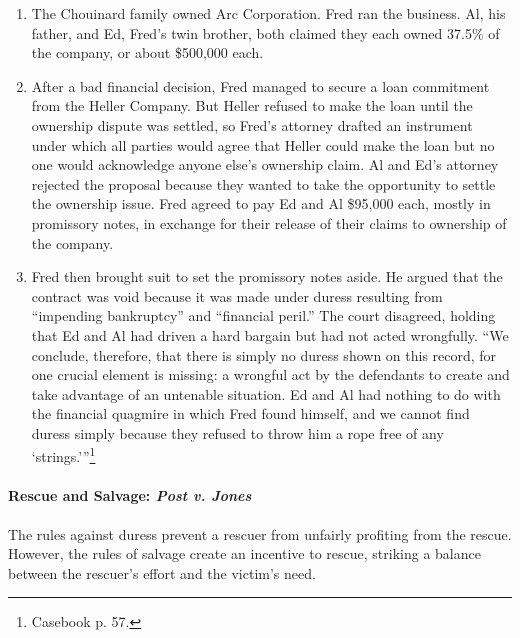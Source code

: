 \begin{enumerate}
    \item The Chouinard family owned Arc Corporation. Fred ran the business. 
    Al, his father, and Ed, Fred's twin brother, both claimed they each owned 
    37.5\% of the company, or about \$500,000 each.
    \item After a bad financial decision, Fred managed to secure a loan 
    commitment from the Heller Company. But Heller refused to make the loan 
    until the ownership dispute was settled, so Fred's attorney drafted an 
    instrument under which all parties would agree that Heller could make the 
    loan but no one would acknowledge anyone else's ownership claim. Al and 
    Ed's attorney rejected the proposal because they wanted to take the 
    opportunity to settle the ownership issue. Fred agreed to pay Ed and Al 
    \$95,000 each, mostly in promissory notes, in exchange for their release 
    of their claims to ownership of the company.
    \item Fred then brought suit to set the promissory notes aside. He argued 
    that the contract was void because it was made under duress resulting from 
    ``impending bankruptcy'' and ``financial peril.'' The court disagreed, 
    holding that Ed and Al had driven a hard bargain but had not acted 
    wrongfully. \enquote{We conclude, therefore, that there is simply no 
    duress shown on this record, for one crucial element is missing: a 
    wrongful act by the defendants to create and take advantage of an 
    untenable situation. Ed and Al had nothing to do with the financial 
    quagmire in which Fred found himself, and we cannot find duress simply 
    because they refused to throw him a rope free of any 
    \enquote{strings.}}\footnote{Casebook p. 57.}
\end{enumerate}

\paragraph{Rescue and Salvage: \emph{Post v. Jones}}

The rules against duress prevent a rescuer from unfairly profiting from the 
rescue. However, the rules of salvage create an incentive to rescue, striking 
a balance between the rescuer's effort and the victim's need.

